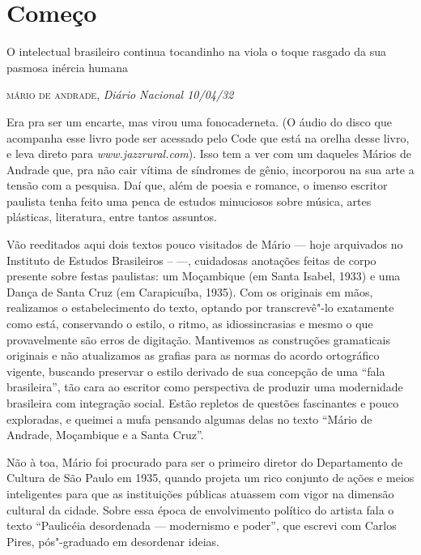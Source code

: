 \chapter*{Começo}

\epigraph{O intelectual brasileiro continua tocandinho na viola
o toque rasgado da sua pasmosa inércia humana}{\textsc{mário de andrade}, \emph{Diário Nacional 10/04/32}}

Era pra ser um encarte, mas virou uma fonocaderneta. (O áudio do 
disco que acompanha esse livro pode ser acessado pelo  Code
que está na orelha desse livro, e leva direto para 
\emph{www.jazzrural.com}). Isso tem a ver com
um daqueles Mários de Andrade que, pra não cair vítima de síndromes de
gênio, incorporou na sua arte a tensão com a pesquisa. Daí que, além de
poesia e romance, o imenso escritor paulista tenha feito uma penca de
estudos minuciosos sobre música, artes plásticas, literatura, entre
tantos assuntos.

Vão reeditados aqui dois textos pouco visitados de Mário --- hoje arquivados
no Instituto de Estudos 
Brasileiros --  ---, cuidadosas
anotações feitas de corpo presente sobre festas paulistas: um Moçambique
(em Santa Isabel, 1933) e uma Dança de Santa Cruz (em Carapicuíba,
1935). Com os originais em mãos, realizamos o estabelecimento do texto, optando por transcrevê"-lo exatamente como está, conservando o estilo, o ritmo, as idiossincrasias e mesmo o que provavelmente são erros de digitação. Mantivemos as construções gramaticais originais e não atualizamos as grafias para as normas do acordo ortográfico vigente, buscando preservar o estilo derivado de sua concepção de uma ``fala brasileira'', tão cara ao escritor como perspectiva de produzir uma modernidade brasileira com integração social. Estão repletos de questões fascinantes e pouco exploradas, e
queimei a mufa pensando algumas delas no texto ``Mário de Andrade, Moçambique
e a Santa Cruz''.

Não à toa, Mário foi procurado para ser o primeiro diretor do
Departamento de Cultura de São Paulo em 1935, quando projeta um rico conjunto de
ações e meios inteligentes para que as instituições públicas atuassem
com vigor na dimensão cultural da cidade. Sobre essa época de
envolvimento político do artista fala o texto ``Paulicéia desordenada ---
modernismo e poder'', que escrevi com Carlos Pires, pós"-graduado em
desordenar ideias.

